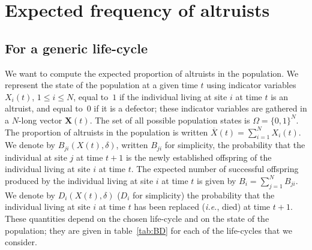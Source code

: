 \documentclass[11pt, letterpaper]{article}
\newcommand{\ie}{\textit{i.e.}}
\newcommand{\appname}[0]{Appendix}
\newcommand{\selstr}{\delta}
\begin{document}
%
\begin{center}
{\color{seccol}{\LARGE \bfseries \appname}}
\end{center}

\pagestyle{appendix}
\singlespace


\section{Expected frequency of altruists\label{sec:app:EX}}



\subsection{For a generic life-cycle \label{sec:app:generic}}

We want to compute the expected proportion of altruists in the population. We represent the state of the population at a given time $t$ using indicator variables $X_i(t)$, $1\leq i \leq N$, equal to~$1$ if the individual living at site $i$ at time $t$ is an altruist, and equal to~$0$ if it is a defector; these indicator variables are gathered in a $N$-long vector $\mathbf{X}(t)$. The set of all possible population states is $\Omega = \{0,1\}^N$. The proportion of altruists in the population is written $\overline{X}(t) = \sum_{i=1}^N X_i(t)$. We denote by $B_{ji}(X(t), \selstr)$, written $B_{ji}$ for simplicity, the probability that the individual at site $j$ at time $t+1$ is the newly established offspring of the individual living at site $i$ at time $t$. The expected number of successful offspring produced by the individual living at site $i$ at time $t$ is given by $B_i = \sum_{j=1}^N B_{ji}$. We denote by $D_{i}(X(t), \selstr)$ ($D_i$ for simplicity) the probability that the individual living at site $i$ at time $t$ has been replaced (\ie, died) at time $t+1$. These quantities depend on the chosen life-cycle and on the state of the population; they are given in table~\ref{tab:BD} for each of the life-cycles that we consider. 
\end{document}

